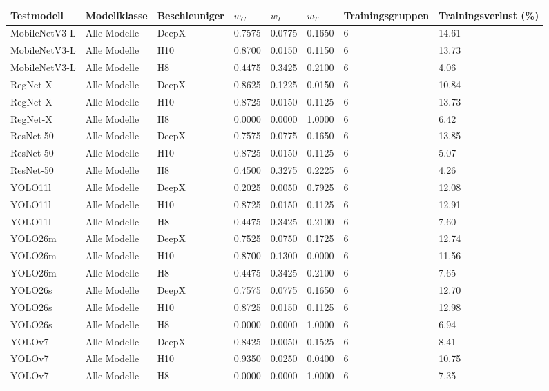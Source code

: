 \begin{tabular}{@{}llllllll@{}}
\toprule
Testmodell & Modellklasse & Beschleuniger & $w_C$ & $w_I$ & $w_T$ & Trainingsgruppen & Trainingsverlust (\%) \\
\midrule
MobileNetV3-L & Alle Modelle & DeepX & 0.7575 & 0.0775 & 0.1650 & 6 & 14.61 \\
MobileNetV3-L & Alle Modelle & H10 & 0.8700 & 0.0150 & 0.1150 & 6 & 13.73 \\
MobileNetV3-L & Alle Modelle & H8 & 0.4475 & 0.3425 & 0.2100 & 6 & 4.06 \\
RegNet-X & Alle Modelle & DeepX & 0.8625 & 0.1225 & 0.0150 & 6 & 10.84 \\
RegNet-X & Alle Modelle & H10 & 0.8725 & 0.0150 & 0.1125 & 6 & 13.73 \\
RegNet-X & Alle Modelle & H8 & 0.0000 & 0.0000 & 1.0000 & 6 & 6.42 \\
ResNet-50 & Alle Modelle & DeepX & 0.7575 & 0.0775 & 0.1650 & 6 & 13.85 \\
ResNet-50 & Alle Modelle & H10 & 0.8725 & 0.0150 & 0.1125 & 6 & 5.07 \\
ResNet-50 & Alle Modelle & H8 & 0.4500 & 0.3275 & 0.2225 & 6 & 4.26 \\
YOLO11l & Alle Modelle & DeepX & 0.2025 & 0.0050 & 0.7925 & 6 & 12.08 \\
YOLO11l & Alle Modelle & H10 & 0.8725 & 0.0150 & 0.1125 & 6 & 12.91 \\
YOLO11l & Alle Modelle & H8 & 0.4475 & 0.3425 & 0.2100 & 6 & 7.60 \\
YOLO26m & Alle Modelle & DeepX & 0.7525 & 0.0750 & 0.1725 & 6 & 12.74 \\
YOLO26m & Alle Modelle & H10 & 0.8700 & 0.1300 & 0.0000 & 6 & 11.56 \\
YOLO26m & Alle Modelle & H8 & 0.4475 & 0.3425 & 0.2100 & 6 & 7.65 \\
YOLO26s & Alle Modelle & DeepX & 0.7575 & 0.0775 & 0.1650 & 6 & 12.70 \\
YOLO26s & Alle Modelle & H10 & 0.8725 & 0.0150 & 0.1125 & 6 & 12.98 \\
YOLO26s & Alle Modelle & H8 & 0.0000 & 0.0000 & 1.0000 & 6 & 6.94 \\
YOLOv7 & Alle Modelle & DeepX & 0.8425 & 0.0050 & 0.1525 & 6 & 8.41 \\
YOLOv7 & Alle Modelle & H10 & 0.9350 & 0.0250 & 0.0400 & 6 & 10.75 \\
YOLOv7 & Alle Modelle & H8 & 0.0000 & 0.0000 & 1.0000 & 6 & 7.35 \\
\bottomrule
\end{tabular}
